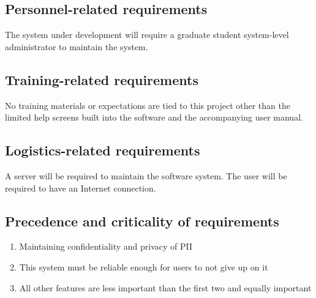		\subsection{Personnel-related requirements}
			The system under development will require a graduate student
			system-level administrator to maintain the system.
		\subsection{Training-related requirements}
			No training materials or expectations are tied to this
			project other than the limited help screens built into the
			software and the accompanying user manual.
		\subsection{Logistics-related requirements}
			A server will be required to maintain the software system.
			The user will be required to have an Internet connection.
		\subsection{Precedence and criticality of requirements}
			\begin{enumerate}
				\item Maintaining confidentiality and privacy of PII
				\item This system must be reliable enough for users to not
					give up on it
				\item All other features are less important than the first
					two and equally important
			\end{enumerate}